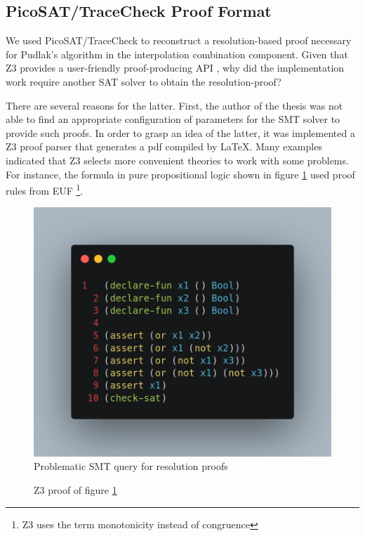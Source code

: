 \subsection{PicoSAT/TraceCheck Proof Format}

We used PicoSAT/TraceCheck to reconstruct a resolution-based proof 
necessary for Pudlak's algorithm in the interpolation combination 
component. Given that Z3 provides a user-friendly proof-producing 
API \cite{Moura_proofsand}, why did the implementation
work require another SAT solver to obtain the resolution-proof?

There are several reasons for the latter. First, the author of the
thesis was not able to find an appropriate configuration of parameters
for the SMT solver to provide such proofs. In order to grasp an idea
of the latter, it was implemented a Z3 proof parser that generates 
a pdf compiled by \LaTeX. Many examples indicated that
Z3 selects more convenient theories to work with some problems. For
instance, the formula in pure propositional logic shown in figure 
\ref{query_proof_problem} used proof rules from EUF \footnote{Z3 uses
the term monotonicity instead of congruence}.

\begin{figure}
  \centering
  \includegraphics[scale=0.2]{figures/query_screenshot}
  \caption{Problematic SMT query for resolution proofs} \label{query_proof_problem}
\end{figure}


%
\begin{figure}
  
  \caption{Z3 proof of figure \ref{query_proof_problem}} \label{smt_proof_problem}
\end{figure}


